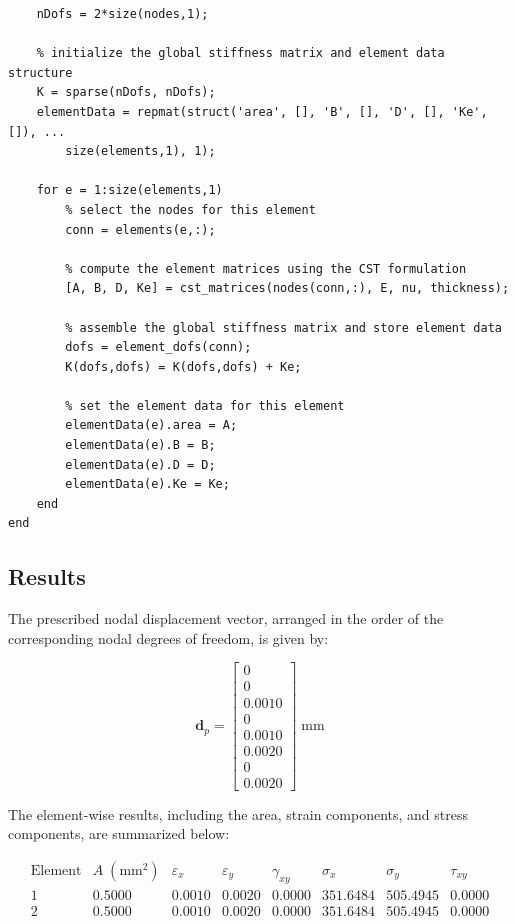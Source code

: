 \begin{lstlisting}[style=matlabcode]
    % setting up the number of degrees of freedom for the global stiffness matrix
    nDofs = 2*size(nodes,1);
    
    % initialize the global stiffness matrix and element data structure
    K = sparse(nDofs, nDofs);
    elementData = repmat(struct('area', [], 'B', [], 'D', [], 'Ke', []), ...
        size(elements,1), 1);
    
    for e = 1:size(elements,1)
        % select the nodes for this element
        conn = elements(e,:);
    
        % compute the element matrices using the CST formulation
        [A, B, D, Ke] = cst_matrices(nodes(conn,:), E, nu, thickness);
    
        % assemble the global stiffness matrix and store element data
        dofs = element_dofs(conn);
        K(dofs,dofs) = K(dofs,dofs) + Ke;
    
        % set the element data for this element
        elementData(e).area = A;
        elementData(e).B = B;
        elementData(e).D = D;
        elementData(e).Ke = Ke;
    end
end
\end{lstlisting}

\subsection{Results}
The prescribed nodal displacement vector, arranged in the order of the corresponding nodal degrees of freedom, is given by:

\[
\mathbf{d}_p =
\begin{bmatrix}
0 \\
0 \\
0.0010 \\
0 \\
0.0010 \\
0.0020 \\
0 \\
0.0020
\end{bmatrix}
\;\text{mm}
\]

The element-wise results, including the area, strain components, and stress components, are summarized below:

\[
\begin{array}{c|c|ccc|ccc}
\text{Element} & A\;(\text{mm}^2)
& \varepsilon_x & \varepsilon_y & \gamma_{xy}
& \sigma_x & \sigma_y & \tau_{xy} \\
\hline
1 & 0.5000 & 0.0010 & 0.0020 & 0.0000
& 351.6484 & 505.4945 & 0.0000 \\
2 & 0.5000 & 0.0010 & 0.0020 & 0.0000
& 351.6484 & 505.4945 & 0.0000
\end{array}
\]


